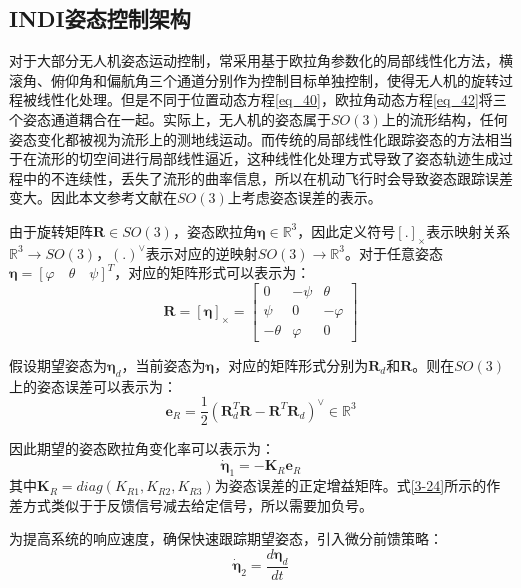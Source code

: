\subsection{INDI姿态控制架构}

对于大部分无人机姿态运动控制，常采用基于欧拉角参数化的局部线性化方法，横滚角、俯仰角和偏航角三个通道分别作为控制目标单独控制，使得无人机的旋转过程被线性化处理。但是不同于位置动态方程\eqref{eq_40}，欧拉角动态方程\eqref{eq_42}将三个姿态通道耦合在一起。实际上，无人机的姿态属于$SO(3)$上的流形结构，任何姿态变化都被视为流形上的测地线运动。而传统的局部线性化跟踪姿态的方法相当于在流形的切空间进行局部线性逼近，这种线性化处理方式导致了姿态轨迹生成过程中的不连续性，丢失了流形的曲率信息，所以在机动飞行时会导致姿态跟踪误差变大。因此本文参考文献\parencite{10.1115/1.4052714}在$SO(3)$上考虑姿态误差的表示。

由于旋转矩阵$\boldsymbol{R}\in{SO(3)}$，姿态欧拉角$\boldsymbol{\eta}\in\mathbb{R}^3$，因此定义符号$[.]_\times$表示映射关系$\mathbb{R}^3\to SO(3)$，$(.)^\vee$表示对应的逆映射$SO(3)\to\mathbb{R}^3$。对于任意姿态$\boldsymbol{\eta}=[\varphi \quad \theta \quad \psi]^T$，对应的矩阵形式可以表示为：
\begin{equation}
    \boldsymbol{R}=[\boldsymbol{\eta}]_\times=
    \begin{bmatrix}
    0 & -\psi & \theta \\
    \psi & 0 & -\varphi \\
    -\theta & \varphi & 0
    \end{bmatrix}
    \label{3-22}
\end{equation}

假设期望姿态为$\boldsymbol{\eta}_d$，当前姿态为$\boldsymbol{\eta}$，对应的矩阵形式分别为$\boldsymbol{R}_d$和$\boldsymbol{R}$。则在${SO(3)}$上的姿态误差可以表示为：
\begin{equation}
    \boldsymbol{e}_R=\dfrac{1}{2}(\boldsymbol{R}_d^T\boldsymbol{R}-\boldsymbol{R}^T\boldsymbol{R}_d)^\vee\in \mathbb{R}^3
    \label{3-23}
\end{equation}

因此期望的姿态欧拉角变化率可以表示为：
\begin{equation}
    \dot{\boldsymbol{\eta}}_1=-\boldsymbol{K}_R\boldsymbol{e}_R
    \label{3-24}
\end{equation}
其中$\boldsymbol{K}_R=diag({K}_{R1},{K}_{R2},{K}_{R3})$为姿态误差的正定增益矩阵。式\eqref{3-24}所示的作差方式类似于于反馈信号减去给定信号，所以需要加负号。

为提高系统的响应速度，确保快速跟踪期望姿态，引入微分前馈策略：
\begin{equation}
    \dot{\boldsymbol{\eta}}_2=\frac{d\boldsymbol{\eta}_d}{dt}
    \label{3-25}
\end{equation}

